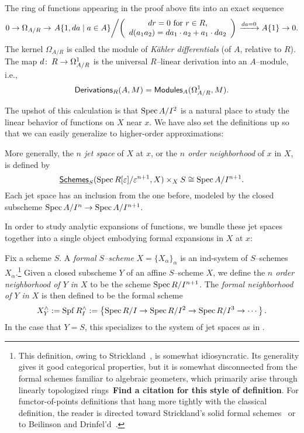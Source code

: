 \begin{definition}
The ring of functions appearing in the proof above fits into an exact sequence \[0 \to \Omega_{A/R} \to \left. A\{1, da \mid a \in A\} \middle/ \left( \begin{array}{c} \text{$dr = 0$ for $r \in R$}, \\ d(a_1 a_2) = da_1 \cdot a_2 + a_1 \cdot da_2 \end{array} \right) \right. \xrightarrow{da = 0} A\{1\} \to 0.\]  The kernel $\Omega_{A/R}$ is called the module of \textit{K\"ahler differentials} (of $A$, relative to $R$).  The map $d\colon\thinspace R\to \Omega^1_{A/R}$ is the universal $R$--linear derivation into an $A$--module, i.e., \[\mathsf{Derivations}_R(A, M) = \mathsf{Modules}_A(\Omega^1_{A/R}, M).\]
\end{definition}

The upshot of this calculation is that $\operatorname{Spec} A/I^2$ is a natural place to study the linear behavior of functions on $X$ near $x$.  We have also set the definitions up so that we can easily generalize to higher-order approximations:
\begin{definition}\label{JetSpacesDefn}
More generally, the \textit{$n${\th} jet space} of $X$ at $x$, or the \textit{$n${\th} order neighborhood} of $x$ in $X$, is defined by \[\operatorname{\underline{\smash{\mathsf{Schemes}}}}_S(\operatorname{Spec} R[\varepsilon] / \varepsilon^{n+1}, X) \times_X S \cong \operatorname{Spec} A / I^{n+1}.\]  Each jet space has an inclusion from the one before, modeled by the closed subscheme $\operatorname{Spec} A/I^n \to \operatorname{Spec} A / I^{n+1}$.
\end{definition}

In order to study analytic expansions of functions, we bundle these jet spaces together into a single object embodying formal expansions in $X$ at $x$:
\begin{definition}\label{DefnCompletion}
Fix a scheme $S$.  A \textit{formal $S$--scheme} $X = \{X_\alpha\}_\alpha$ is an ind-system of $S$--schemes $X_\alpha$.\footnote{This definition, owing to Strickland~\cite[Definition 4.1]{StricklandFSFG}, is somewhat idiosyncratic.  Its generality gives it good categorical properties, but it is somewhat disconnected from the formal schemes familiar to algebraic geometers, which primarily arise through linearly topologized rings~\textbf{Find a citation for this style of definition}.  For functor-of-points definitions that hang more tightly with the classical definition, the reader is directed toward Strickland's solid formal schemes~\cite[Section 4.2]{StricklandFSFG} or to Beilinson and Drinfel'd~\cite[Section 7.11.1]{BeilinsonDrinfeld}.}  Given a closed subscheme $Y$ of an affine $S$--scheme $X$, we define the \textit{$n${\th} order neighborhood of $Y$ in $X$} to be the scheme $\operatorname{Spec} R/I^{n+1}$.  The \textit{formal neighborhood of $Y$ in $X$} is then defined to be the formal scheme \[X^\wedge_Y := \operatorname{Spf} R^\wedge_I := \left\{ \operatorname{Spec} R/I \to \operatorname{Spec} R/I^2 \to \operatorname{Spec} R/I^3 \to \cdots \right\}.\]  In the case that $Y = S$, this specializes to the system of jet spaces as in .
\end{definition}

